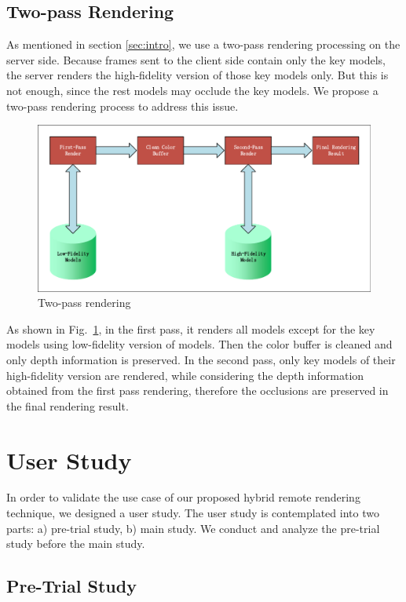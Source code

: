 \subsection{Two-pass Rendering}

As mentioned in section \ref{sec:intro}, we use a two-pass rendering processing on the server side.
Because frames sent to the client side contain only the key models, the server renders the high-fidelity version of those key models only.
But this is not enough, since the rest models may occlude the key models.
We propose a two-pass rendering process to address this issue.

\begin{figure}[!htbp]
	\centering
	\includegraphics[width=0.7\columnwidth]{figures/two-pass-rendering.pdf}
	\caption{Two-pass rendering}
	\label{fig:tp-rendering}
\end{figure}

As shown in Fig.~\ref{fig:tp-rendering}, in the first pass, it renders all models except for the key models using low-fidelity version of models. Then the color buffer is cleaned and only depth information is preserved. In the second pass, only key models of their high-fidelity version are rendered, while considering the depth information obtained from the first pass rendering, therefore the occlusions are preserved in the final rendering result.

\section{User Study}

In order to validate the use case of our proposed hybrid remote rendering technique, we designed a user study. The user study is contemplated into two parts: a) pre-trial study, b) main study. We conduct and analyze the pre-trial study before the main study.

\subsection{Pre-Trial Study}

